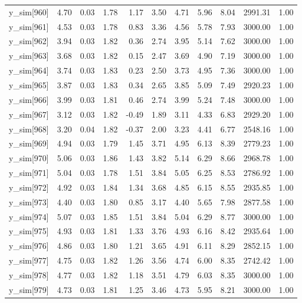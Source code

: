 \begin{table}[ht]
\begin{tabular}{rrrrrrrrrrr}
  y\_sim[960] & 4.70 & 0.03 & 1.78 & 1.17 & 3.50 & 4.71 & 5.96 & 8.04 & 2991.31 & 1.00 \\ 
  y\_sim[961] & 4.53 & 0.03 & 1.78 & 0.83 & 3.36 & 4.56 & 5.78 & 7.93 & 3000.00 & 1.00 \\ 
  y\_sim[962] & 3.94 & 0.03 & 1.82 & 0.36 & 2.74 & 3.95 & 5.14 & 7.62 & 3000.00 & 1.00 \\ 
  y\_sim[963] & 3.68 & 0.03 & 1.82 & 0.15 & 2.47 & 3.69 & 4.90 & 7.19 & 3000.00 & 1.00 \\ 
  y\_sim[964] & 3.74 & 0.03 & 1.83 & 0.23 & 2.50 & 3.73 & 4.95 & 7.36 & 3000.00 & 1.00 \\ 
  y\_sim[965] & 3.87 & 0.03 & 1.83 & 0.34 & 2.65 & 3.85 & 5.09 & 7.49 & 2920.23 & 1.00 \\ 
  y\_sim[966] & 3.99 & 0.03 & 1.81 & 0.46 & 2.74 & 3.99 & 5.24 & 7.48 & 3000.00 & 1.00 \\ 
  y\_sim[967] & 3.12 & 0.03 & 1.82 & -0.49 & 1.89 & 3.11 & 4.33 & 6.83 & 2929.20 & 1.00 \\ 
  y\_sim[968] & 3.20 & 0.04 & 1.82 & -0.37 & 2.00 & 3.23 & 4.41 & 6.77 & 2548.16 & 1.00 \\ 
  y\_sim[969] & 4.94 & 0.03 & 1.79 & 1.45 & 3.71 & 4.95 & 6.13 & 8.39 & 2779.23 & 1.00 \\ 
  y\_sim[970] & 5.06 & 0.03 & 1.86 & 1.43 & 3.82 & 5.14 & 6.29 & 8.66 & 2968.78 & 1.00 \\ 
  y\_sim[971] & 5.04 & 0.03 & 1.78 & 1.51 & 3.84 & 5.05 & 6.25 & 8.53 & 2786.92 & 1.00 \\ 
  y\_sim[972] & 4.92 & 0.03 & 1.84 & 1.34 & 3.68 & 4.85 & 6.15 & 8.55 & 2935.85 & 1.00 \\ 
  y\_sim[973] & 4.40 & 0.03 & 1.80 & 0.85 & 3.17 & 4.40 & 5.65 & 7.98 & 2877.58 & 1.00 \\ 
  y\_sim[974] & 5.07 & 0.03 & 1.85 & 1.51 & 3.84 & 5.04 & 6.29 & 8.77 & 3000.00 & 1.00 \\ 
  y\_sim[975] & 4.93 & 0.03 & 1.81 & 1.33 & 3.76 & 4.93 & 6.16 & 8.42 & 2935.64 & 1.00 \\ 
  y\_sim[976] & 4.86 & 0.03 & 1.80 & 1.21 & 3.65 & 4.91 & 6.11 & 8.29 & 2852.15 & 1.00 \\ 
  y\_sim[977] & 4.75 & 0.03 & 1.82 & 1.26 & 3.56 & 4.74 & 6.00 & 8.35 & 2742.42 & 1.00 \\ 
  y\_sim[978] & 4.77 & 0.03 & 1.82 & 1.18 & 3.51 & 4.79 & 6.03 & 8.35 & 3000.00 & 1.00 \\ 
  y\_sim[979] & 4.73 & 0.03 & 1.81 & 1.25 & 3.46 & 4.73 & 5.95 & 8.21 & 3000.00 & 1.00 \\ 

\end{tabular}
\end{table}
